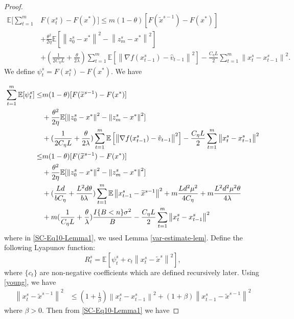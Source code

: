 \documentclass{article}
\newcommand*{\E}{\mathbb{E}}
\newcommand{\norm}[1]{\left\lVert#1\right\rVert}
\theoremstyle{definition}
\theoremstyle{remark}
\begin{document}
{{\begin{proof}
\begin{equation}
\begin{split}
\E[\sum_{t=1}^{m}&F(x_{t}^s)-F(x^*)] \leq  m(1-\theta)[F(\widetilde{x}^{s-1})-F(x^*)] \\
&+ {\frac{ \theta^2}{2\eta}}\E[\norm{z_{0}^s-x^*}^2-\norm{z_{m}^s-x^*}^2]\\
&+(\frac{1}{2C_{\eta} L}+\frac{\theta}{2\lambda})\sum_{t=1}^{m}\E\left[\norm{\nabla f(x_{t-1}^s)-\hat{v}_{t-1}}^2\right]-\frac{C_{\eta} L}{2}\sum_{t=1}^{m}\norm{x_{t}^s-x_{t-1}^s}^2. 
\end{split}
\end{equation}
We define $\psi_t^s = F({x}^s_t)-F(x^*)$. We have

\begin{align}
\sum_{t=1}^{m}\E[\psi_{t}^s] \leq &m(1-\theta)[F(\widetilde{x}^{s-1})-F(x^*)]\notag\\
&+ {\frac{ \theta^2}{2\eta}}\E[\norm{z_{0}^s-x^*}^2-\norm{z_{m}^s-x^*}^2]\notag\\
&+(\frac{1}{2C_{\eta} L}+\frac{\theta}{2\lambda})\sum_{t=1}^{m}\E\left[\norm{\nabla f(x_{t-1}^s)-\hat{v}_{t-1}}^2\right]-\frac{C_{\eta} L}{2}\sum_{t=1}^{m}\norm{x_{t}^s-x_{t-1}^s}^2\notag\\
\leq &m(1-\theta)[F(\widetilde{x}^{s-1})-F(x^*)] \notag\\
&+ {\frac{ \theta^2}{2\eta}}\E[\norm{z_{0}^s-x^*}^2-\norm{z_{m}^s-x^*}^2]\notag\\
&+(\frac{Ld}{bC_{\eta}}+\frac{L^2d\theta}{b\lambda})\sum_{t=1}^{m} \E\norm{x_{t-1}^s-\widetilde{x}^{s-1}}^2+m\frac{Ld^2\mu^2}{4C_{\eta}}+m\frac{ L^2d^2\mu^2\theta}{4\lambda}\notag\\
&+ m(\frac{1}{C_{\eta} L}+\frac{\theta}{\lambda})\frac{I\{B < n\} \sigma ^2}{B}-\frac{C_{\eta} L}{2}\sum_{t=1}^{m}\norm{x_{t}^s-x_{t-1}^s}^2\label{SC-Eq10-Lemma1}
\end{align}
where in \eqref{SC-Eq10-Lemma1}, we used Lemma \ref{var-estimate-lem}. Define the following Lyapunov function:
\begin{equation}
R_t^s = \E\left[\psi_{t}^s+ c_t\norm{x_t^s-\tilde{x}^s}^2\right],
\end{equation}
where $\{c_t\}$ are non-negative coefficients which are defined recursively later. Using \eqref{young}, we have
\begin{align}
\norm{x_{t}^s-\widetilde{x}^{s-1}}^2 &\leq (1+\frac{1}{\beta})\norm{x_{t}^s-x_{t-1}^s}^2+(1+\beta)\norm{x_{t-1}^s-\widetilde{x}^{s-1}}^2
\end{align}
where $\beta > 0$. Then from \eqref{SC-Eq10-Lemma1} we have 


\end{proof}}}
\end{document}
